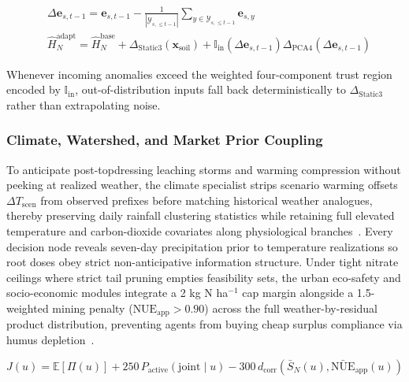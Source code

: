 \documentclass[11pt,a4paper]{article}
\begin{document}
\begin{equation}
\begin{aligned}
&\Delta \mathbf{e}_{s,t-1} = \mathbf{e}_{s,t-1} - \frac{1}{|\mathcal{Y}_{s, \le t-1}|} \sum_{y \in \mathcal{Y}_{s, \le t-1}} \mathbf{e}_{s,y} \\
&\hat{H}_N^{\text{adapt}} = \hat{H}_N^{\text{base}} + \Delta_{\text{Static3}}(\mathbf{x}_{\text{soil}}) + \mathbb{I}_{\text{in}}(\Delta \mathbf{e}_{s,t-1}) \Delta_{\text{PCA4}}(\Delta \mathbf{e}_{s,t-1})
\end{aligned}
\end{equation}

Whenever incoming anomalies exceed the weighted four-component trust region encoded by $\mathbb{I}_{\text{in}}$, out-of-distribution inputs fall back deterministically to $\Delta_{\text{Static3}}$ rather than extrapolating noise.

\subsubsection{Climate, Watershed, and Market Prior Coupling}

To anticipate post-topdressing leaching storms and warming compression without peeking at realized weather, the climate specialist strips scenario warming offsets $\Delta T_{\text{scen}}$ from observed prefixes before matching historical weather analogues, thereby preserving daily rainfall clustering statistics while retaining full elevated temperature and carbon-dioxide covariates along physiological branches~\citep{asseng2015}. Every decision node reveals seven-day precipitation prior to temperature realizations so root doses obey strict non-anticipative information structure. Under tight nitrate ceilings where strict tail pruning empties feasibility sets, the urban eco-safety and socio-economic modules integrate a 2 kg N ha$^{-1}$ cap margin alongside a 1.5-weighted mining penalty ($\text{NUE}_{\text{app}} > 0.90$) across the full weather-by-residual product distribution, preventing agents from buying cheap surplus compliance via humus depletion~\citep{tessler2018,cawley2010}.

\begin{equation}
J(u) = \mathbb{E}[\Pi(u)] + 250 \, P_{\text{active}}(\text{joint} \mid u) - 300 \, d_{\text{corr}}\!\left(\bar{S}_N(u), \bar{\text{NUE}}_{\text{app}}(u)\right)
\end{equation}
\end{document}
